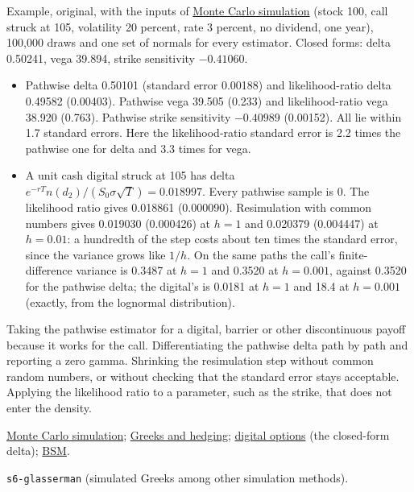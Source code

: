 \begin{qfmethod}
 Example, original, with the inputs of \hyperref[meth:monte-carlo-simulation]{Monte Carlo simulation} (stock 100, call struck at 105, volatility 20 percent, rate 3 percent, no dividend, one year), 100{,}000 draws and one set of normals for every estimator. Closed forms: delta 0.50241, vega 39.894, strike sensitivity $-0.41060$.
\begin{itemize}
\item Pathwise delta 0.50101 (standard error 0.00188) and likelihood-ratio delta 0.49582 (0.00403). Pathwise vega 39.505 (0.233) and likelihood-ratio vega 38.920 (0.763). Pathwise strike sensitivity $-0.40989$ (0.00152). All lie within 1.7 standard errors. Here the likelihood-ratio standard error is 2.2 times the pathwise one for delta and 3.3 times for vega.
\item A unit cash digital struck at 105 has delta $e^{-rT}n(d_2)/(S_0\sigma\sqrt T)=0.018997$. Every pathwise sample is 0. The likelihood ratio gives 0.018861 (0.000090). Resimulation with common numbers gives 0.019030 (0.000426) at $h=1$ and 0.020379 (0.004447) at $h=0.01$: a hundredth of the step costs about ten times the standard error, since the variance grows like $1/h$. On the same paths the call's finite-difference variance is 0.3487 at $h=1$ and 0.3520 at $h=0.001$, against 0.3520 for the pathwise delta; the digital's is 0.0181 at $h=1$ and 18.4 at $h=0.001$ (exactly, from the lognormal distribution).
\end{itemize}

 Taking the pathwise estimator for a digital, barrier or other discontinuous payoff because it works for the call. Differentiating the pathwise delta path by path and reporting a zero gamma. Shrinking the resimulation step without common random numbers, or without checking that the standard error stays acceptable. Applying the likelihood ratio to a parameter, such as the strike, that does not enter the density.

 \hyperref[meth:monte-carlo-simulation]{Monte Carlo simulation}; \hyperref[meth:greeks-delta-gamma-hedging]{Greeks and hedging}; \hyperref[meth:digital-option-valuation]{digital options} (the closed-form delta); \hyperref[mod:black-scholes-merton]{BSM}.

 \nolinkurl{s6-glasserman} (simulated Greeks among other simulation methods).

\end{qfmethod}
